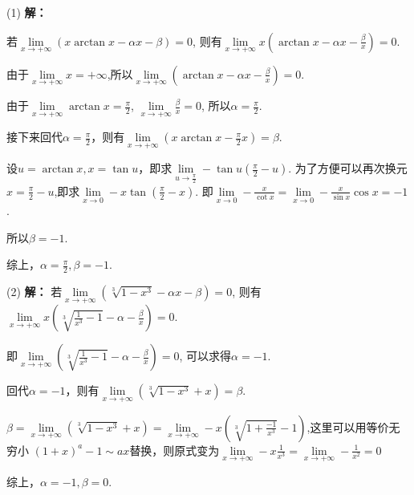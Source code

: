 \documentclass[12pt , a4paper , oneside]{ctexart}
\begin{document}
            \begin{mdframed}
            (1) \textbf{解：}

            若$\lim\limits_{x \to +\infty} (x\arctan x - \alpha x - \beta) = 0$,
            则有$\lim\limits_{x \to +\infty} x(\arctan x - \alpha x - \frac{\beta}{x}) = 0$.

            由于$\lim\limits_{x \to +\infty} x = +\infty$,所以$\lim\limits_{x \to +\infty} (\arctan x - \alpha x - \frac{\beta}{x}) = 0$.

            由于$\lim\limits_{x \to +\infty} \arctan x = \frac{\pi}{2}$,
            $\lim\limits_{x \to +\infty} \frac{\beta}{x} = 0$,
            所以$\alpha = \frac{\pi}{2}$.

            接下来回代$\alpha = \frac{\pi}{2}$，则有$\lim\limits_{x \to +\infty} (x\arctan x - \frac{\pi}{2} x)=\beta$.

            设$u=\arctan x,x = \tan u$，即求$\lim\limits_{u \to \frac{\pi}{2}} - \tan u(\frac{\pi}{2} - u)$.
            为了方便可以再次换元$x = \frac{\pi}{2} - u$,即求$\lim\limits_{x \to 0} - x \tan(\frac{\pi}{2} - x)$.
            即$\lim\limits_{x \to 0} - \frac{x}{\cot x} = \lim\limits_{x \to 0} - \frac{x}{\sin x}\cos x = -1$.

            所以$\beta = -1$.
            
            综上，$\alpha = \frac{\pi}{2},\beta = -1$.
            \end{mdframed}
            
            \begin{mdframed}
            (2) \textbf{解：}
            若$\lim\limits_{x \to +\infty} (\sqrt[3]{1-x^{3}}-\alpha x - \beta) = 0$,
            则有$\lim\limits_{x \to +\infty} x (\sqrt[3]{ \frac{1}{x^3} - 1}-\alpha- \frac{\beta}{x}) = 0$.

            即$\lim\limits_{x \to +\infty} (\sqrt[3]{ \frac{1}{x^3} - 1}-\alpha- \frac{\beta}{x}) = 0$,
            可以求得$\alpha = -1$. 
            
            回代$\alpha = -1$，则有$\lim\limits_{x \to +\infty} (\sqrt[3]{1-x^{3}}+x)=\beta$.

            $\beta = \lim\limits_{x \to +\infty} (\sqrt[3]{1-x^{3}}+x) =
            \lim\limits_{x \to +\infty} -x (\sqrt[3]{ 1 + \frac{-1}{x^3} }-1)$,这里可以用等价无穷小
            $(1+x)^a -1 \sim ax$替换，则原式变为$\lim\limits_{x \to +\infty} -x\frac{1}{x^3} = 
            \lim\limits_{x \to +\infty} -\frac{1}{x^2} = 0$
            
            综上，$\alpha = -1,\beta = 0$.
            \end{mdframed}
\end{document}
